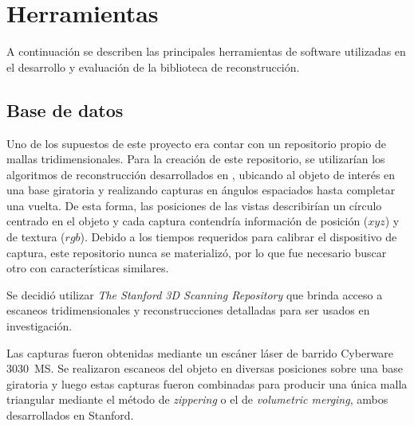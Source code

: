 \chapter{Herramientas}
A continuación se describen las principales herramientas de software
utilizadas en el desarrollo y evaluación de la biblioteca de reconstrucción.

\section{Base de datos}
Uno de los supuestos de este proyecto era contar con un repositorio propio de
mallas tridimensionales.
Para la creación de este repositorio,
se utilizarían los algoritmos de reconstrucción desarrollados en \cite{Pancho},
ubicando al objeto de interés en una base giratoria y realizando capturas
en ángulos espaciados hasta completar una vuelta.
De esta forma, las posiciones de las vistas describirían un círculo centrado en el objeto y
cada captura contendría información de posición ($xyz$) y de textura ($rgb$).
Debido a los tiempos requeridos para calibrar el dispositivo de captura,
este repositorio nunca se materializó,
 por lo que fue necesario buscar otro con características similares.


Se decidió utilizar \emph{The Stanford 3D Scanning Repository}\cite{StanfordScanRep} que brinda
acceso a escaneos tridimensionales y reconstrucciones detalladas para ser
usados en investigación.

Las capturas fueron obtenidas mediante un escáner láser de barrido Cyberware
3030~MS.  Se realizaron escaneos del objeto en diversas posiciones sobre una
base giratoria y luego estas capturas fueron combinadas para producir una única
malla triangular mediante el método de \emph{zippering}\cite{Turk:1994:ZPM:192161.192241} o el de
\emph{volumetric merging}\cite{Curless:1996:VMB:237170.237269}, ambos desarrollados en
Stanford.

